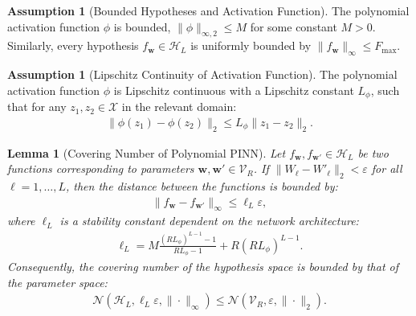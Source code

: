 \documentclass{article}
\theoremstyle{plain}
\newtheorem{lemma}[theorem]{Lemma}
\theoremstyle{definition}
\newtheorem{assumption}[theorem]{Assumption}
\theoremstyle{remark}
\begin{document}
\begin{assumption}[Bounded Hypotheses and Activation Function]
\label{assump:poly_pinn_bounded}
The polynomial activation function $\phi$ is bounded, $\|\phi\|_{\infty, 2} \le M$ for some constant $M > 0$. Similarly, every hypothesis $f_{\bm{w}} \in \mathcal{H}_L$ is uniformly bounded by $\|f_{\bm{w}}\|_{\infty} \le F_{\max}$.
\end{assumption}

\begin{assumption}[Lipschitz Continuity of Activation Function]
\label{assump:poly_pinn_lip}
The polynomial activation function $\phi$ is Lipschitz continuous with a Lipschitz constant $L_{\phi}$, such that for any $z_1, z_2 \in \mathcal{X}$ in the relevant domain:
\begin{align*}
    \|\phi(z_1) - \phi(z_2)\|_2 \le L_{\phi} \|z_1 - z_2\|_2.
\end{align*}
\end{assumption}

\begin{lemma}[Covering Number of Polynomial PINN]
\label{lem:poly_pinn_covering}
Let $f_{\bm{w}}, f_{\bm{w}'} \in \mathcal{H}_L$ be two functions corresponding to parameters $\bm{w}, \bm{w}' \in \mathcal{V}_R$. If $\|W_{\ell} - W'_{\ell}\|_{2} < \varepsilon$ for all $\ell = 1, \dots, L$, then the distance between the functions is bounded by:
\begin{align*}
    \|f_{\bm{w}} - f_{\bm{w}'}\|_{\infty} \le \ell_L \varepsilon,
\end{align*}
where $\ell_L$ is a stability constant dependent on the network architecture:
\begin{align*}
    \ell_L = M \frac{(R L_{\phi})^{L-1} - 1}{R L_{\phi} - 1} + R(R L_{\phi})^{L-1}.
\end{align*}
Consequently, the covering number of the hypothesis space is bounded by that of the parameter space:
\begin{align*}
    \mathcal{N}(\mathcal{H}_L, \ell_L \varepsilon, \|\cdot\|_{\infty}) \le \mathcal{N}(\mathcal{V}_R, \varepsilon, \|\cdot\|_{2}).
\end{align*}
\end{lemma}
\end{document}
